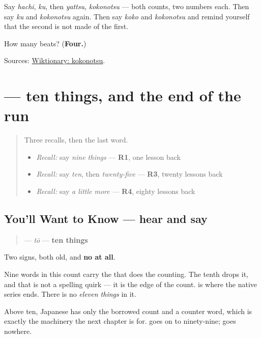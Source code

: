 Say \emph{hachi}, \emph{ku}, then \emph{yattsu}, \emph{kokonotsu} — both counts, two numbers each. Then say \emph{ku} and \emph{kokonotsu} again. Then say \emph{koko} and \emph{kokonotsu} and remind yourself that the second is not made of the first.

\begin{tcolorbox}[breakable,colback=teal!4,colframe=teal!35!black,title={Before you move on}]
How many beats? (\textbf{Four.})

Sources: \href{https://en.wiktionary.org/wiki/\%E4\%B9\%9D\%E3\%81\%A4}{Wiktionary: kokonotsu}.
\end{tcolorbox}
\section[\texorpdfstring{\ja{とお} (tō)}{とお (tō)}]{ — ten things, and the end of the run}

\label{lesson:JA-C17-too}



\begin{quote}
Three recalls, then the last word.

\begin{itemize}
\raggedright
  \item \emph{Recall:} say \emph{nine things} — \textbf{R1}, one lesson back
  \item \emph{Recall:} say \emph{ten}, then \emph{twenty-five} — \textbf{R3}, twenty lessons back
  \item \emph{Recall:} say \emph{a little more} — \textbf{R4}, eighty lessons back
\end{itemize}
\end{quote}

\subsection*{You'll Want to Know — hear and say}
\begin{quote}
\textbf{} — \emph{tō} — \textbf{ten things}
\end{quote}

Two signs, both old, and \textbf{no  at all}.

Nine words in this count carry the \textbf{} that does the counting. The tenth drops it, and that is not a spelling quirk — it is the edge of the count. \textbf{} is where the native series ends. There is no \emph{eleven things} in it.

Above ten, Japanese has only the borrowed count and a counter word, which is exactly the machinery the next chapter is for. \textbf{} goes on to ninety-nine; \textbf{} goes nowhere.

